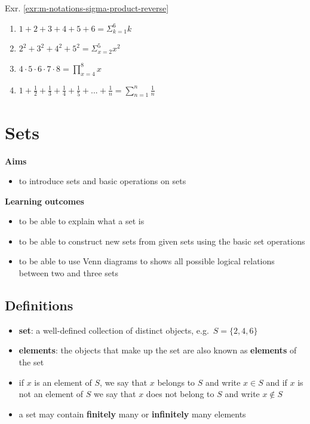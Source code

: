 \documentclass[
]{book}
\providecommand{\tightlist}{%
  \setlength{\itemsep}{0pt}\setlength{\parskip}{0pt}}
\theoremstyle{definition}
\theoremstyle{definition}
\theoremstyle{definition}
\theoremstyle{remark}
\begin{document}
Exr. \ref{exr:m-notations-sigma-product-reverse}

\begin{enumerate}
\def\labelenumi{\alph{enumi})}
\item
  \(1+2+3+4+5+6 = \Sigma_{k=1}^{6}k\)
\item
  \(2^2+3^2+4^2+5^2 = \Sigma_{x=2}^{5}x^2\)
\item
  \(4 \cdot 5 \cdot 6 \cdot 7 \cdot 8 = \prod_{x=4}^{8}x\)
\item
  \(1 + \frac{1}{2} + \frac{1}{3} + \frac{1}{4} + \frac{1}{5} + ... + \frac{1}{n} = \sum_{n=1}^{n}\frac{1}{n}\)
\end{enumerate}

\hypertarget{sets}{%
\chapter{Sets}\label{sets}}

\textbf{Aims}

\begin{itemize}
\tightlist
\item
  to introduce sets and basic operations on sets
\end{itemize}

\textbf{Learning outcomes}

\begin{itemize}
\tightlist
\item
  to be able to explain what a set is
\item
  to be able to construct new sets from given sets using the basic set operations
\item
  to be able to use Venn diagrams to shows all possible logical relations between two and three sets
\end{itemize}

\hypertarget{definitions}{%
\section{Definitions}\label{definitions}}

\begin{itemize}
\tightlist
\item
  \textbf{set}: a well-defined collection of distinct objects, e.g.~\(S = \{2, 4, 6\}\)
\item
  \textbf{elements}: the objects that make up the set are also known as \textbf{elements} of the set
\item
  if \(x\) is an element of \(S\), we say that \(x\) belongs to \(S\) and write \(x \in S\) and if \(x\) is not an element of \(S\) we say that \(x\) does not belong to \(S\) and write \(x \notin S\)
\item
  a set may contain \textbf{finitely} many or \textbf{infinitely} many elements
\end{itemize}
\end{document}
